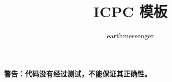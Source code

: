 \documentclass{article}
\title{ICPC 模板}
\author{earthmessenger}
\begin{document}
\maketitle

\clearpage

\textbf{警告：代码没有经过测试，不能保证其正确性。}

\tableofcontents






\end{document}
